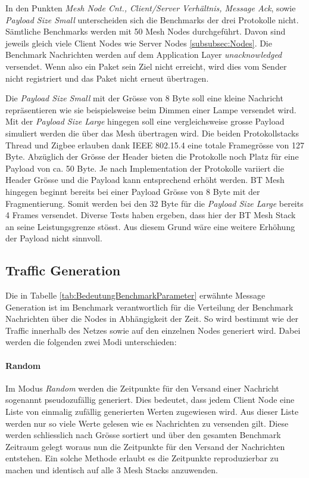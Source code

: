 In den Punkten \textit{Mesh Node Cnt., Client/Server Verhältnis, Message Ack}, sowie \textit{Payload Size Small} unterscheiden sich die Benchmarks der drei Protokolle nicht.
Sämtliche Benchmarks werden mit 50 Mesh Nodes durchgeführt. Davon sind jeweils gleich viele Client Nodes wie Server Nodes \ref{subsubsec:Nodes}.
Die Benchmark Nachrichten werden auf dem Application Layer \textit{unacknowledged} versendet. Wenn also ein Paket sein Ziel nicht erreicht, wird dies vom Sender nicht registriert und das Paket nicht erneut übertragen.

Die \textit{Payload Size Small} mit der Grösse von 8 Byte soll eine kleine Nachricht repräsentieren wie sie beispielsweise beim Dimmen einer Lampe versendet wird.
Mit der \textit{Payload Size Large} hingegen soll eine vergleichsweise grosse Payload simuliert werden die über das Mesh übertragen wird.
Die beiden Protokollstacks Thread und Zigbee erlauben dank IEEE 802.15.4  eine totale Framegrösse von 127 Byte.
Abzüglich der Grösse der Header bieten die Protokolle noch Platz für eine Payload von ca. 50 Byte. Je nach Implementation der Protokolle variiert die Header Grösse und die Payload kann entsprechend erhöht werden.
BT Mesh hingegen beginnt bereits bei einer Payload Grösse von 8 Byte mit der Fragmentierung. Somit werden bei den 32 Byte für die \textit{Payload Size Large} bereits 4 Frames versendet. Diverse Tests haben ergeben, dass hier der BT Mesh Stack an seine Leistungsgrenze stösst.
Aus diesem Grund wäre eine weitere Erhöhung der Payload nicht sinnvoll.



\subsection{Traffic Generation}\label{subsec:TrafficGeneration}

Die in Tabelle \ref{tab:BedeutungBenchmarkParameter} erwähnte Message Generation ist im Benchmark verantwortlich für die Verteilung der Benchmark Nachrichten über die Nodes in Abhängigkeit der Zeit. So wird bestimmt wie der Traffic innerhalb des Netzes sowie auf den einzelnen Nodes generiert wird.
Dabei werden die folgenden zwei Modi unterschieden:

\paragraph{Random}\label{par:Random}
Im Modus \textit{Random} werden die Zeitpunkte für den Versand einer Nachricht sogenannt pseudozufällig generiert. Dies bedeutet, dass jedem Client Node eine Liste von einmalig zufällig generierten Werten zugewiesen wird.
Aus dieser Liste werden nur so viele Werte gelesen wie es Nachrichten zu versenden gilt. Diese werden schliesslich nach Grösse sortiert und über den gesamten Benchmark Zeitraum gelegt woraus nun die Zeitpunkte für den Versand der Nachrichten entstehen.
Ein solche Methode erlaubt es die Zeitpunkte reproduzierbar zu machen und identisch auf alle 3 Mesh Stacks anzuwenden.

